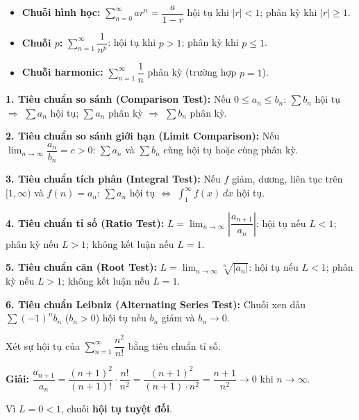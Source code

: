\documentclass[12pt,a4paper]{article}
\begin{document}
\begin{tinhchat}[title={Các chuỗi đặc biệt}]
  \begin{itemize}
    \item \textbf{Chuỗi hình học:} $\displaystyle\sum_{n=0}^\infty ar^n = \dfrac{a}{1-r}$ \; hội tụ khi $|r| < 1$; phân kỳ khi $|r| \ge 1$.
    \item \textbf{Chuỗi $p$:} $\displaystyle\sum_{n=1}^\infty \dfrac{1}{n^p}$: hội tụ khi $p > 1$; phân kỳ khi $p \le 1$.
    \item \textbf{Chuỗi harmonic:} $\displaystyle\sum_{n=1}^\infty \dfrac{1}{n}$ phân kỳ (trường hợp $p=1$).
  \end{itemize}
\end{tinhchat}

\begin{congthuc}[title={Các tiêu chuẩn hội tụ}]
  \textbf{1. Tiêu chuẩn so sánh (Comparison Test):}
  Nếu $0 \le a_n \le b_n$: $\sum b_n$ hội tụ $\Rightarrow$ $\sum a_n$ hội tụ; $\sum a_n$ phân kỳ $\Rightarrow$ $\sum b_n$ phân kỳ.

  \textbf{2. Tiêu chuẩn so sánh giới hạn (Limit Comparison):}
  Nếu $\displaystyle\lim_{n\to\infty} \dfrac{a_n}{b_n} = c > 0$: $\sum a_n$ và $\sum b_n$ cùng hội tụ hoặc cùng phân kỳ.

  \textbf{3. Tiêu chuẩn tích phân (Integral Test):}
  Nếu $f$ giảm, dương, liên tục trên $[1,\infty)$ và $f(n) = a_n$: $\sum a_n$ hội tụ $\Leftrightarrow$ $\displaystyle\int_1^\infty f(x)\,dx$ hội tụ.

  \textbf{4. Tiêu chuẩn tỉ số (Ratio Test):}
  $L = \displaystyle\lim_{n\to\infty}\left|\dfrac{a_{n+1}}{a_n}\right|$: hội tụ nếu $L < 1$; phân kỳ nếu $L > 1$; không kết luận nếu $L = 1$.

  \textbf{5. Tiêu chuẩn căn (Root Test):}
  $L = \displaystyle\lim_{n\to\infty} \sqrt[n]{|a_n|}$: hội tụ nếu $L < 1$; phân kỳ nếu $L > 1$; không kết luận nếu $L = 1$.

  \textbf{6. Tiêu chuẩn Leibniz (Alternating Series Test):}
  Chuỗi xen dấu $\displaystyle\sum (-1)^n b_n$ ($b_n > 0$) hội tụ nếu $b_n$ giảm và $b_n \to 0$.
\end{congthuc}

\begin{vidu}
  Xét sự hội tụ của $\displaystyle\sum_{n=1}^\infty \dfrac{n^2}{n!}$ bằng tiêu chuẩn tỉ số.

  \medskip\textbf{Giải:}
  $\dfrac{a_{n+1}}{a_n} = \dfrac{(n+1)^2}{(n+1)!} \cdot \dfrac{n!}{n^2} = \dfrac{(n+1)^2}{(n+1) \cdot n^2} = \dfrac{n+1}{n^2} \to 0$ khi $n \to \infty$.

  Vì $L = 0 < 1$, chuỗi \textbf{hội tụ tuyệt đối}.
\end{vidu}
\end{document}
